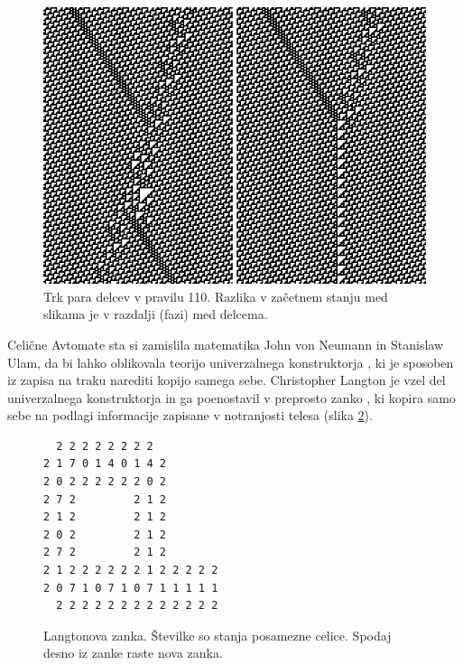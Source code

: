 \documentclass[12pt,a4paper,openany,twoside]{book}
\begin{document}
\vspace{5mm}
\begin{figure}[htb]
\centerline{\includegraphics[width=13.9cm]{ca110-interaction2}}
\caption[Trk delcev v pravilu 110.]
{Trk para delcev v pravilu 110. Razlika v začetnem stanju med slikama je v razdalji (fazi) med delcema.}
\label{ca110-interaction2}
\end{figure}

\vspace{5mm}
Celične Avtomate sta si zamislila matematika John von Neumann in Stanislaw Ulam,
da bi lahko oblikovala teorijo univerzalnega konstruktorja \cite{WikiVonNeumannUniversalConstructor},
ki je sposoben iz zapisa na traku narediti kopijo samega sebe.
Christopher Langton je vzel del univerzalnega konstruktorja in ga poenostavil v preprosto zanko \cite{WikiLangtonLoops},
ki kopira samo sebe na podlagi informacije zapisane v notranjosti telesa (slika \ref{langtons_loop}).

\vspace{5mm}
\begin{figure}[htb]
\centering
\begin{BVerbatim}
  2 2 2 2 2 2 2 2 
2 1 7 0 1 4 0 1 4 2
2 0 2 2 2 2 2 2 0 2
2 7 2         2 1 2
2 1 2         2 1 2
2 0 2         2 1 2
2 7 2         2 1 2
2 1 2 2 2 2 2 2 1 2 2 2 2 2
2 0 7 1 0 7 1 0 7 1 1 1 1 1
  2 2 2 2 2 2 2 2 2 2 2 2 2
\end{BVerbatim}
\caption[Langtonova zanka.]
{Langtonova zanka. Številke so stanja posamezne celice. Spodaj desno iz zanke raste nova zanka.}
\label{langtons_loop}
\end{figure}
\vspace{5mm}
\end{document}
